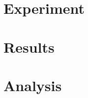 \documentclass{article}
\begin{document}
\section{Experiment}




















\section{Results}























\section{Analysis}
\end{document}
